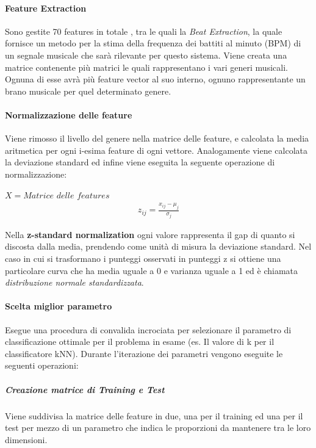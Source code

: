 \documentclass[%
 reprint,
 amsmath,amssymb,
 aps,
 article,
]{revtex4-1}
\begin{document}
\paragraph{Feature Extraction} Sono gestite 70 features in totale \cite {feattype}, tra le quali la \textit{Beat Extraction}, la quale fornisce un metodo per la stima della frequenza dei battiti al minuto (BPM) di un segnale musicale che sarà rilevante per questo sistema. Viene creata una matrice contenente più matrici le quali rappresentano i vari generi musicali. Ognuna di esse avrà più feature vector al suo interno, ognuno rappresentante un brano musicale per quel determinato genere.

\paragraph{Normalizzazione delle feature} \cite {norm}
Viene rimosso il livello del genere nella matrice delle feature, e calcolata la media aritmetica per ogni i-esima feature di ogni vettore. Analogamente viene calcolata la deviazione standard ed infine viene eseguita la seguente operazione di normalizzazione: 

$X = Matrice$ $delle$ $features$
\larger[1.5]
\begin{align*}
z_{ij} = \frac{ x_{ij} - \mu_{j} } {\sigma_{j} }
\end{align*}

Nella \textbf{z-standard normalization} ogni valore rappresenta il gap di quanto si discosta dalla media, prendendo come unità di misura la deviazione standard. 
Nel caso in cui si trasformano i punteggi osservati in punteggi z si ottiene una particolare curva che ha media uguale a 0 e varianza uguale a 1 ed è chiamata \textit{distribuzione normale standardizzata}.

\paragraph{Scelta miglior parametro}
Esegue una procedura di convalida incrociata per selezionare il parametro di classificazione ottimale per il problema in esame (es. Il valore di k per il classificatore kNN). Durante l'iterazione dei parametri vengono eseguite le seguenti operazioni:

\subparagraph{Creazione matrice di Training e Test}
Viene suddivisa la matrice delle feature in due, una per il training ed una per il test per mezzo di un parametro che indica le proporzioni da mantenere tra le loro dimensioni.
\end{document}
